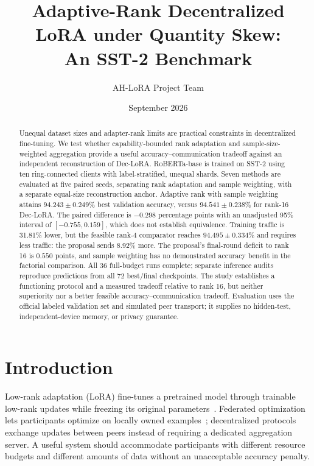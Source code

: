 \documentclass[11pt]{article}
\title{Adaptive-Rank Decentralized LoRA under Quantity Skew:\\An SST-2 Benchmark}
\author{AH-LoRA Project Team}
\date{September 2026}
\begin{document}
\maketitle

\begin{abstract}
Unequal dataset sizes and adapter-rank limits are practical constraints in decentralized fine-tuning. We test whether capability-bounded rank adaptation and sample-size-weighted aggregation provide a useful accuracy--communication tradeoff against an independent reconstruction of Dec-LoRA. RoBERTa-base is trained on SST-2 using ten ring-connected clients with label-stratified, unequal shards. Seven methods are evaluated at five paired seeds, separating rank adaptation and sample weighting, with a separate equal-size reconstruction anchor. Adaptive rank with sample weighting attains $94.243\pm0.249\%$ best validation accuracy, versus $94.541\pm0.238\%$ for rank-16 Dec-LoRA. The paired difference is $-0.298$ percentage points with an unadjusted 95\% interval of $[-0.755,0.159]$, which does not establish equivalence. Training traffic is 31.81\% lower, but the feasible rank-4 comparator reaches $94.495\pm0.334\%$ and requires less traffic: the proposal sends 8.92\% more. The proposal's final-round deficit to rank 16 is $0.550$ points, and sample weighting has no demonstrated accuracy benefit in the factorial comparison. All 36 full-budget runs complete; separate inference audits reproduce predictions from all 72 best/final checkpoints. The study establishes a functioning protocol and a measured tradeoff relative to rank 16, but neither superiority nor a better feasible accuracy--communication tradeoff. Evaluation uses the official labeled validation set and simulated peer transport; it supplies no hidden-test, independent-device memory, or privacy guarantee.
\end{abstract}

\section{Introduction}
Low-rank adaptation (LoRA) fine-tunes a pretrained model through trainable low-rank updates while freezing its original parameters~\citep{hu2022lora}. Federated optimization lets participants optimize on locally owned examples~\citep{mcmahan2017fedavg}; decentralized protocols exchange updates between peers instead of requiring a dedicated aggregation server. A useful system should accommodate participants with different resource budgets and different amounts of data without an unacceptable accuracy penalty.
\end{document}

